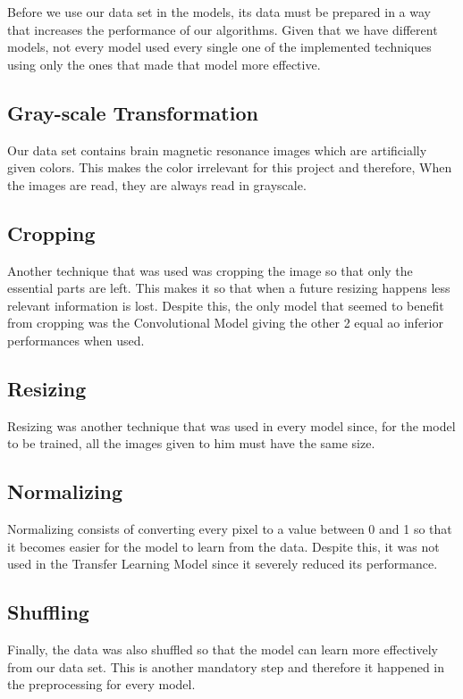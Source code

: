 \documentclass[conference]{IEEEtran}
\begin{document}
Before we use our data set in the models, its data must be prepared in a way that increases the performance of our algorithms. Given that we have different models, not every model used every single one of the implemented techniques using only the ones that made that model more effective.

\subsection{Gray-scale Transformation}

Our data set contains brain magnetic resonance images which are artificially given colors. This makes the color irrelevant for this project and therefore, When the images are read, they are always read in grayscale.

\subsection{Cropping}

Another technique that was used was cropping the image so that only the essential parts are left. This makes it so that when a future resizing happens less relevant information is lost. Despite this, the only model that seemed to benefit from cropping was the Convolutional Model giving the other 2 equal ao inferior performances when used.

\subsection{Resizing}

Resizing was another technique that was used in every model since, for the model to be trained, all the images given to him must have the same size.

\subsection{Normalizing}

Normalizing consists of converting every pixel to a value between 0 and 1 so that it becomes easier for the model to learn from the data. Despite this, it was not used in the Transfer Learning Model since it severely reduced its performance.

\subsection{Shuffling}

Finally, the data was also shuffled so that the model can learn more effectively from our data set. This is another mandatory step and therefore it happened in the preprocessing for every model.
\end{document}
